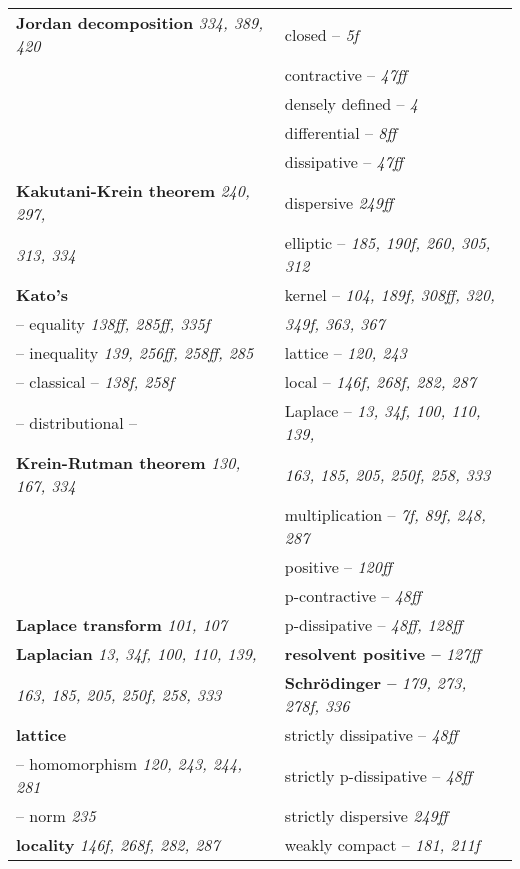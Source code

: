 \documentclass{article}
\begin{document}
\begin{longtable}{p{}p{}}
\textbf{Jordan decomposition} \textit{334, 389, 420} & \quad closed -- \textit{5f} \\
& \quad contractive -- \textit{47ff} \\
& \quad densely defined -- \textit{4} \\
& \quad differential -- \textit{8ff} \\
& \quad dissipative -- \textit{47ff} \\
\textbf{Kakutani-Krein theorem} \textit{240, 297,} & \quad dispersive \textit{249ff} \\
\quad \textit{313, 334} & \quad elliptic -- \textit{185, 190f, 260, 305, 312} \\
\textbf{Kato's} & \quad kernel -- \textit{104, 189f, 308ff, 320,} \\
\quad -- equality \textit{138ff, 285ff, 335f} & \quad\quad \textit{349f, 363, 367} \\
\quad -- inequality \textit{139, 256ff, 258ff, 285} & \quad lattice -- \textit{120, 243} \\
\quad -- classical -- \textit{138f, 258f} & \quad local -- \textit{146f, 268f, 282, 287} \\
\quad -- distributional -- & \quad Laplace -- \textit{13, 34f, 100, 110, 139,} \\
\textbf{Krein-Rutman theorem} \textit{130, 167, 334} & \quad\quad \textit{163, 185, 205, 250f, 258, 333} \\
& \quad multiplication -- \textit{7f, 89f, 248, 287} \\
& \quad positive -- \textit{120ff} \\
& \quad p-contractive -- \textit{48ff} \\
\textbf{Laplace transform} \textit{101, 107} & \quad p-dissipative -- \textit{48ff, 128ff} \\
\textbf{Laplacian} \textit{13, 34f, 100, 110, 139,} & \textbf{resolvent positive --} \textit{127ff} \\
\quad \textit{163, 185, 205, 250f, 258, 333} & \textbf{Schrödinger --} \textit{179, 273, 278f, 336} \\
\textbf{lattice} & \quad strictly dissipative -- \textit{48ff} \\
\quad -- homomorphism \textit{120, 243, 244, 281} & \quad strictly p-dissipative -- \textit{48ff} \\
\quad -- norm \textit{235} & \quad strictly dispersive \textit{249ff} \\
\textbf{locality} \textit{146f, 268f, 282, 287} & \quad weakly compact -- \textit{181, 211f} \\

\end{longtable}
\end{document}
